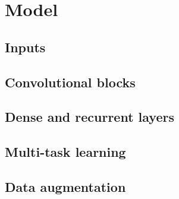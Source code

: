 \chapter{Model}
\label{chap:chap5}


\section{Inputs}
\section{Convolutional blocks}
\section{Dense and recurrent layers}
\section{Multi-task learning}
\section{Data augmentation}


